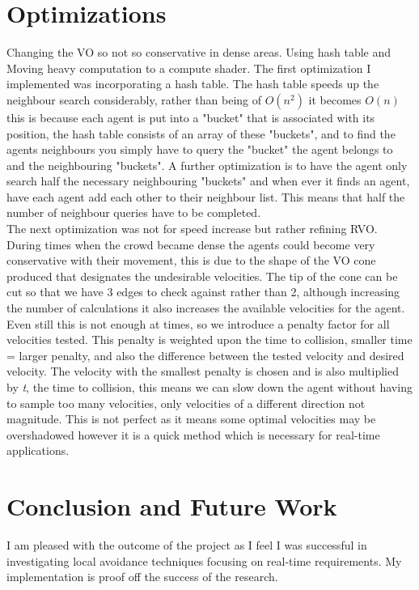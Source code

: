 \documentclass[a4paper,twocolumn]{article}
\begin{document}
\section{Optimizations}
Changing the VO so not so conservative in dense areas. 
Using hash table and Moving heavy computation to a compute shader. \cite{NOthman2013SP}
The first optimization I implemented was incorporating a hash table. The hash table speeds up the neighbour search considerably, rather than being of $O(n^{2})$ it becomes $O(n)$ this is because each agent is put into a "bucket" that is associated with its position, the hash table consists of an array of these "buckets", and to find the agents neighbours you simply have to query the "bucket" the agent belongs to and the neighbouring "buckets". A further optimization is to have the agent only search half the necessary neighbouring "buckets" and when ever it finds an agent, have each agent add each other to their neighbour list. This means that half the number of neighbour queries have to be completed.\\
The next optimization was not for speed increase but rather refining RVO. During times when the crowd became dense the agents could become very conservative with their movement, this is due to the shape of the VO cone produced that designates the undesirable velocities. The tip of the cone can be cut so that we have 3 edges to check against rather than 2\cite{AGuy2009CP}, although increasing the number of calculations it also increases the available velocities for the agent. Even still this is not enough at times, so we introduce a penalty factor for all velocities tested. This penalty is weighted upon the time to collision, smaller time = larger penalty, and also the difference between the tested velocity and desired velocity. The velocity with the smallest penalty is chosen and is also multiplied by \emph{t}, the time to collision, this means we can slow down the agent without having to sample too many velocities, only velocities of a different direction not magnitude. This is not perfect as it means some optimal velocities may be overshadowed however it is a quick method which is necessary for real-time applications.

\section{Conclusion and Future Work}
I am pleased with the outcome of the project as I feel I was successful in investigating local avoidance techniques focusing on real-time requirements. My implementation is proof off the success of the research.


%


\end{document}
